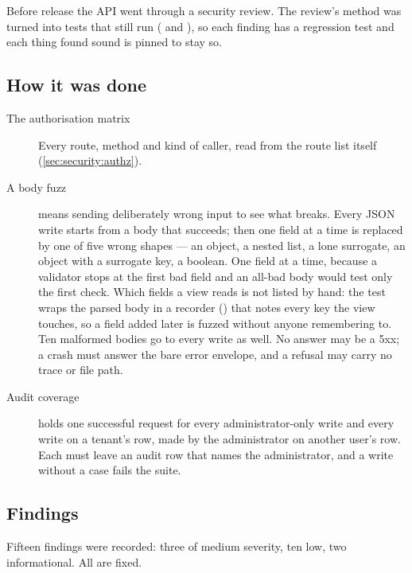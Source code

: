 Before release the API went through a security review. The review's method
was turned into tests that still run ( and
), so each finding has a regression test and each thing
found sound is pinned to stay so.

\subsection{How it was done}

\begin{description}
  \item[The authorisation matrix] Every route, method and kind of caller, read from the
    route list itself (\cref{sec:security:authz}).
  \item[A body fuzz]  means sending deliberately wrong input to see what
    breaks. Every JSON write starts from a body that succeeds; then one field at a time is
    replaced by one of five wrong shapes --- an object, a nested list, a lone surrogate, an
    object with a surrogate key, a boolean. One field at a time, because a validator stops
    at the first bad field and an all-bad body would test only the first check. Which fields
    a view reads is not listed by hand: the test wraps the parsed body in a recorder
    () that notes every key the view touches, so a field added later is
    fuzzed without anyone remembering to. Ten malformed bodies go to every write as well. No
    answer may be a 5xx; a crash must answer the bare error envelope, and a refusal may
    carry no trace or file path.
  \item[Audit coverage]  holds one successful request for every
    administrator-only write and every write on a tenant's row, made by the administrator on
    another user's row. Each must leave an audit row that names the administrator, and a
    write without a case fails the suite.
\end{description}

\subsection{Findings}

Fifteen findings were recorded: three of medium severity, ten low, two informational. All
are fixed.

